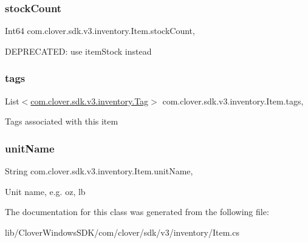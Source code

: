 \subsubsection{\texorpdfstring{stock\+Count}{stockCount}}
{\footnotesize\ttfamily Int64 com.\+clover.\+sdk.\+v3.\+inventory.\+Item.\+stock\+Count\hspace{0.3cm}{\ttfamily [get]}, {\ttfamily [set]}}



D\+E\+P\+R\+E\+C\+A\+T\+ED\+: use item\+Stock instead 

\mbox{\label{classcom_1_1clover_1_1sdk_1_1v3_1_1inventory_1_1_item_a5d623c51808818ce0363e8911c68e6dd}} 
\subsubsection{\texorpdfstring{tags}{tags}}
{\footnotesize\ttfamily List$<$\hyperlink{classcom_1_1clover_1_1sdk_1_1v3_1_1inventory_1_1_tag}{com.\+clover.\+sdk.\+v3.\+inventory.\+Tag}$>$ com.\+clover.\+sdk.\+v3.\+inventory.\+Item.\+tags\hspace{0.3cm}{\ttfamily [get]}, {\ttfamily [set]}}



Tags associated with this item 

\mbox{\label{classcom_1_1clover_1_1sdk_1_1v3_1_1inventory_1_1_item_a3831c28627732a1c99f5c3ecfe8ada43}} 
\subsubsection{\texorpdfstring{unit\+Name}{unitName}}
{\footnotesize\ttfamily String com.\+clover.\+sdk.\+v3.\+inventory.\+Item.\+unit\+Name\hspace{0.3cm}{\ttfamily [get]}, {\ttfamily [set]}}



Unit name, e.\+g. oz, lb 



The documentation for this class was generated from the following file\+:\begin{DoxyCompactItemize}
\item 
lib/\+Clover\+Windows\+S\+D\+K/com/clover/sdk/v3/inventory/Item.\+cs\end{DoxyCompactItemize}
